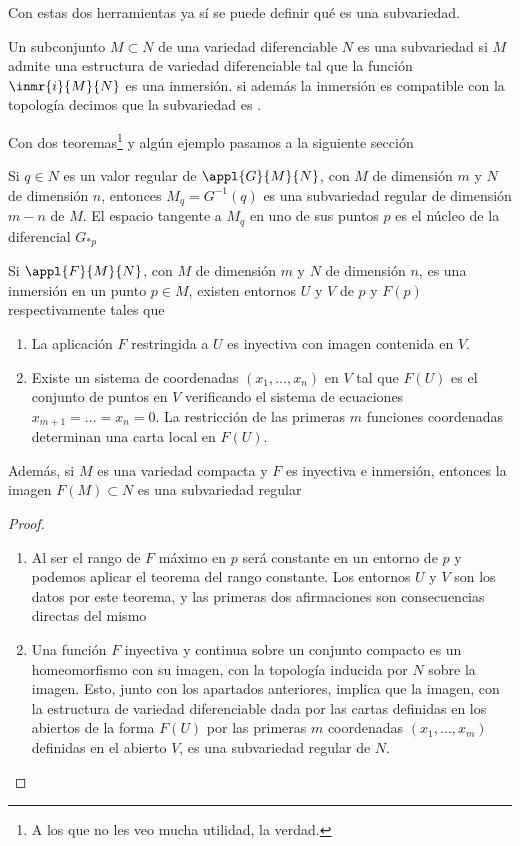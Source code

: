Con estas dos herramientas ya sí se puede definir qué es una subvariedad.

\begin{defn}[Subvariedad] Un subconjunto $M \subset N$ de una variedad diferenciable $N$ es una subvariedad si $M$ admite una estructura de variedad diferenciable tal que la función $\inmr{i}{M}{N}$ es una inmersión. si además la inmersión es compatible con la topología decimos que la subvariedad es .
\end{defn}

Con dos teoremas\footnote{A los que no les veo mucha utilidad, la verdad.} y algún ejemplo pasamos a la siguiente sección

\begin{theorem} \label{thm:Submersion}
Si $q \in N$ es un valor regular de $\appl{G}{M}{N}$, con $M$ de dimensión $m$ y $N$ de dimensión $n$, entonces $M_q=G^{-1}(q)$ es una subvariedad regular de dimensión $m-n$ de $M$. El espacio tangente a $M_q$ en uno de sus puntos $p$ es el núcleo de la diferencial $G_{*p}$
\end{theorem}

\begin{theorem}\label{thm:Inmersion}
Si $\appl{F}{M}{N}$, con $M$ de dimensión $m$ y $N$ de dimensión $n$, es una inmersión en un punto $p \in M$, existen entornos $U$ y $V$ de $p$ y $F(p)$ respectivamente tales que
\begin{enumerate}
\item La aplicación $F$ restringida a $U$ es inyectiva con imagen contenida en $V$.
\item Existe un sistema de coordenadas $(x_1,\dots,x_n)$ en $V$ tal que $F(U)$ es el conjunto de puntos en $V$ verificando el sistema de ecuaciones $x_{m+1}=...=x_n=0$. La restricción de las primeras $m$ funciones coordenadas determinan una carta local en $F(U)$.
\end{enumerate}

Además, si $M$ es una variedad compacta y $F$ es inyectiva e inmersión, entonces la imagen $F(M)\subset N$ es una subvariedad regular
\end{theorem}
\begin{proof}
\begin{enumerate}
\item Al ser el rango de $F$ máximo en $p$ será constante en un entorno de $p$ y podemos aplicar el teorema del rango constante. Los entornos $U$ y $V$ son los datos por este teorema, y las primeras dos afirmaciones son consecuencias directas del mismo

\item Una función $F$ inyectiva y continua sobre un conjunto compacto es un homeomorfismo con su imagen, con la topología inducida por $N$ sobre la imagen. Esto, junto con los apartados anteriores, implica que la imagen, con la estructura de variedad diferenciable dada por las cartas definidas en los abiertos de la forma $F(U)$ por las primeras $m$ coordenadas $(x_1,\dots,x_m)$ definidas en el abierto $V$, es una subvariedad regular de $N$.
\end{enumerate}
\end{proof}

